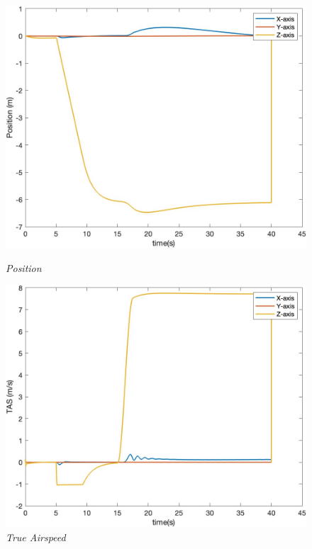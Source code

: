 \begin{figure}[htbp]
  \centering
  \begin{minipage}[b]{0.45\textwidth}
    \centering
    \includegraphics[width=\textwidth]{Images/Gust/VTOL step/1 position_4.jpg}
    \caption*{\textit{Position}}
  \end{minipage}
  \hfil
  \begin{minipage}[b]{0.45\textwidth}
    \centering
    \includegraphics[width=\textwidth]{Images/Gust/VTOL step/2 airspeed_4.jpg}
    \caption*{\textit{True Airspeed}}
  \end{minipage}

\end{figure}
